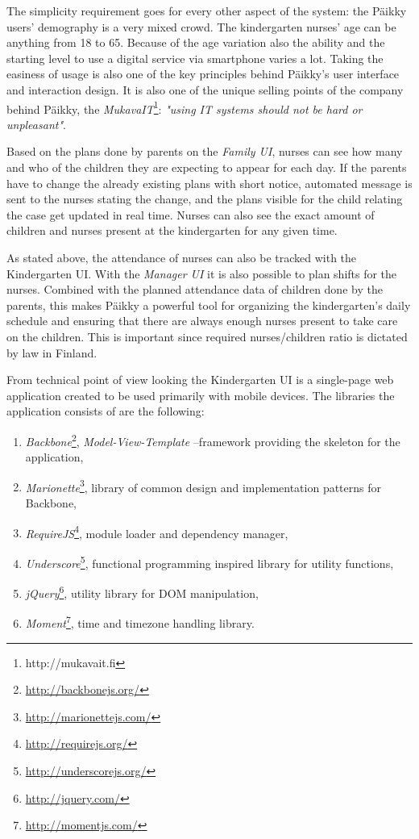 The simplicity requirement goes for every other aspect of the system: the Päikky users' demography is a very mixed crowd. The kindergarten nurses' age can be anything from 18 to 65. Because of the age variation also the ability and the starting level to use a digital service via smartphone varies a lot. Taking the easiness of usage is also one of the key principles behind Päikky's user interface and interaction design. It is also one of the unique selling points of the company behind Päikky, the \textit{MukavaIT}\footnote{http://mukavait.fi}: \textit{"using IT systems should not be hard or unpleasant"}.

Based on the plans done by parents on the \textit{Family UI}, nurses can see how many and who of the children they are expecting to appear for each day. If the parents have to change the already existing plans with short notice, automated message is sent to the nurses stating the change, and the plans visible for the child relating the case get updated in real time. Nurses can also see the exact amount of children and nurses present at the kindergarten for any given time.

As stated above, the attendance of nurses can also be tracked with the Kindergarten UI. With the \textit{Manager UI} it is also possible to plan shifts for the nurses. Combined with the planned attendance data of children done by the parents, this makes Päikky a powerful tool for organizing the kindergarten's daily schedule and ensuring that there are always enough nurses present to take care on the children. This is important since required nurses/children ratio is dictated by law in Finland. %

From technical point of view looking the Kindergarten UI is a single-page web application created to be used primarily with mobile devices. The libraries the application consists of are the following: %

\begin{enumerate}
	\item \textit{Backbone}\footnote{\href{http://backbonejs.org/}{http://backbonejs.org/}}, \textit{Model-View-Template} --framework providing the skeleton for the application,
	\item \textit{Marionette}\footnote{\href{http://marionettejs.com/}{http://marionettejs.com/}}, library of common design and implementation patterns for Backbone,
	\item \textit{RequireJS}\footnote{\href{http://requirejs.org/}{http://requirejs.org/}}, module loader and dependency manager,
	\item \textit{Underscore}\footnote{\href{http://underscorejs.org/}{http://underscorejs.org/}}, functional programming inspired library for utility functions,
	\item \textit{jQuery}\footnote{\href{http://jquery.com/}{http://jquery.com/}}, utility library for DOM manipulation,
	\item \textit{Moment}\footnote{\href{http://momentjs.com/}{http://momentjs.com/}}, time and timezone handling library. 
\end{enumerate}


